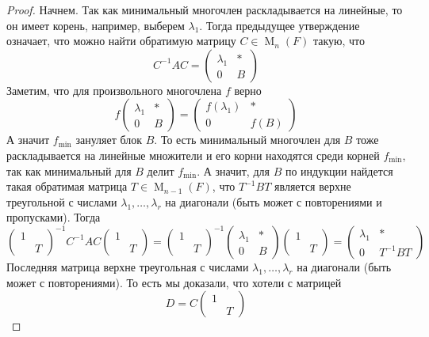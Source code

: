 \begin{proof}
Начнем.
Так как минимальный многочлен раскладывается на линейные, то он имеет корень, например, выберем $\lambda_1$.
Тогда предыдущее утверждение означает, что можно найти обратимую матрицу $C\in \operatorname{M}_n(F)$ такую, что
\[
C^{-1}AC =
\begin{pmatrix}
{\lambda_1}&{*}\\
{0}&{B}
\end{pmatrix}
\]
Заметим, что для произвольного многочлена $f$ верно
\[
f\begin{pmatrix}
{\lambda_1}&{*}\\
{0}&{B}
\end{pmatrix}
=
\begin{pmatrix}
{f(\lambda_1)}&{*}\\
{0}&{f(B)}
\end{pmatrix}
\]
А значит $f_\text{min}$ зануляет блок $B$.
То есть минимальный многочлен для $B$ тоже раскладывается на линейные множители и его корни находятся среди корней $f_\text{min}$, так как минимальный для $B$ делит $f_\text{min}$.
А значит, для $B$ по индукции найдется такая обратимая матрица $T\in \operatorname{M}_{n-1}(F)$, что $T^{-1}BT$ является верхне треугольной с числами $\lambda_1,\ldots,\lambda_r$ на диагонали (быть может с повторениями и пропусками).
Тогда
\[
\begin{pmatrix}
{1}&{}\\
{}&{T}
\end{pmatrix}^{-1}
C^{-1}AC
\begin{pmatrix}
{1}&{}\\
{}&{T}
\end{pmatrix}
=
\begin{pmatrix}
{1}&{}\\
{}&{T}
\end{pmatrix}^{-1}
\begin{pmatrix}
{\lambda_1}&{*}\\
{0}&{B}
\end{pmatrix}
\begin{pmatrix}
{1}&{}\\
{}&{T}
\end{pmatrix}=
\begin{pmatrix}
{\lambda_1}&{*}\\
{0}&{T^{-1}BT}
\end{pmatrix}
\]
Последняя матрица верхне треугольная с числами $\lambda_1,\ldots,\lambda_r$ на диагонали (быть может с повторениями).
То есть мы доказали, что хотели с матрицей
\[
D = C 
\begin{pmatrix}
{1}&{}\\
{}&{T}
\end{pmatrix}
\]
\end{proof}

